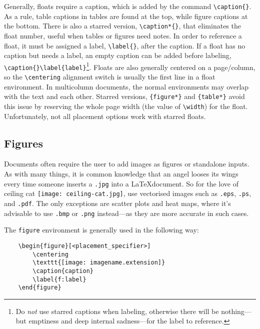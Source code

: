 Generally, floats require a caption, which is added by the command \verb|\caption{}|. As a rule, table captions in tables are found at the top, while figure captions at the bottom. There is also a starred version, \verb|\caption*{}|, that eliminates the float number, useful when tables or figures need notes. In order to reference a float, it must be assigned a label, \verb|\label{}|, after the caption. If a float has no caption but needs a label, an empty caption can be added before labeling, \verb|\caption{}\label{label}|\footnote{Do \emph{not} use starred captions when labeling, otherwise there will be nothing---but emptiness and deep internal sadness---for the label to reference.}. Floats are also generally centered on a page/column, so the \verb|\centering| alignment switch is usually the first line in a float environment. In multicolumn documents, the normal environments may overlap with the text and each other. Starred versions, \verb|{figure*}| and \verb|{table*}| avoid this issue by reserving the whole page width (the value of \verb|\width|) for the float. Unfortunately, not all placement options work with starred floats.
%
\subsection{Figures}
%
Documents often require the user to add images as figures or standalone inputs. As with many things, it is common knowledge that an angel looses its wings every time someone inserts a \texttt{.jpg} into a \LaTeX document. So for the love of ceiling cat \texttt{[image: ceiling-cat.jpg]}, use vectorised images such as \texttt{.eps}, \texttt{.ps}, and \texttt{.pdf}. The only exceptions are scatter plots and heat maps, where it's advisable to use \texttt{.bmp} or \texttt{.png} instead---as they are more accurate in such cases.

The \verb|figure| environment is generally used in the following way:
\begin{verbatim}
	\begin{figure}[<placement_specifier>]
	    \centering
	    \texttt{[image: imagename.extension]}
	    \caption{caption}
	    \label{f:label}
	\end{figure}
\end{verbatim}

